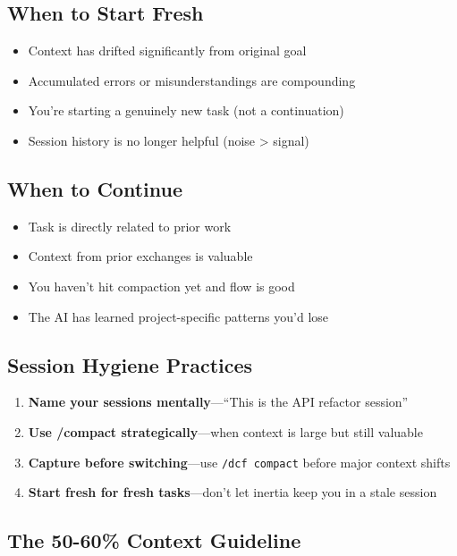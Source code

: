 \subsection{When to Start Fresh}

\begin{itemize}
    \item Context has drifted significantly from original goal
    \item Accumulated errors or misunderstandings are compounding
    \item You're starting a genuinely new task (not a continuation)
    \item Session history is no longer helpful (noise > signal)
\end{itemize}

\subsection{When to Continue}

\begin{itemize}
    \item Task is directly related to prior work
    \item Context from prior exchanges is valuable
    \item You haven't hit compaction yet and flow is good
    \item The AI has learned project-specific patterns you'd lose
\end{itemize}

\subsection{Session Hygiene Practices}

\begin{enumerate}
    \item \textbf{Name your sessions mentally}---``This is the API refactor session''
    \item \textbf{Use /compact strategically}---when context is large but still valuable
    \item \textbf{Capture before switching}---use \texttt{/dcf compact} before major context shifts
    \item \textbf{Start fresh for fresh tasks}---don't let inertia keep you in a stale session
\end{enumerate}

\subsection{The 50-60\% Context Guideline}

